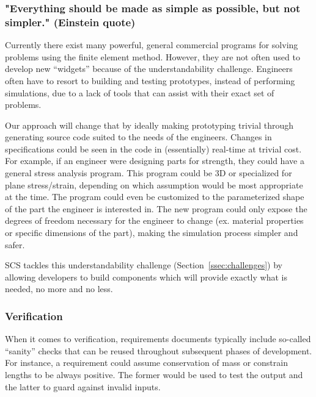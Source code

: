 \documentclass{sig-alternate-05-2015}
\newcommand{\lss}{SCS}
\begin{document}
\subsubsection{"Everything should be made as simple as possible, but not
  simpler."  (Einstein quote)} \label{sssec:adv_simple}

Currently there exist many powerful, general commercial programs for solving
problems using the finite element method. However, they are not often used to
develop new ``widgets'' because of the understandability challenge.
Engineers often have to resort to building and testing prototypes, instead of
performing simulations, due to a lack of tools that can assist with their exact
set of problems. %

Our approach will change that by ideally making prototyping trivial through
generating source code suited to the needs of the engineers. Changes in
specifications could be seen in the code in (essentially) real-time at trivial
cost. For example, if an engineer were designing parts for strength, they could
have a general stress analysis program. This program could be 3D or specialized
for plane stress/strain, depending on which assumption would be most appropriate
at the time. The program could even be customized to the parameterized shape of
the part the engineer is interested in. The new program could only expose the
degrees of freedom necessary for the engineer to change (ex. material properties
or specific dimensions of the part), making the simulation process simpler and
safer.

\lss{} tackles this understandability challenge (Section~\ref{ssec:challenges})
by allowing developers to build components which will provide exactly what is
needed, no more and no less.

\subsubsection{Verification} \label{sssec:adv_verify}

When it comes to verification, requirements documents typically include
so-called ``sanity'' checks that can be reused throughout subsequent phases of
development. For instance, a requirement could assume conservation of mass or
constrain lengths to be always positive. The former would be used to test the
output and the latter to guard against invalid inputs.
\end{document}
